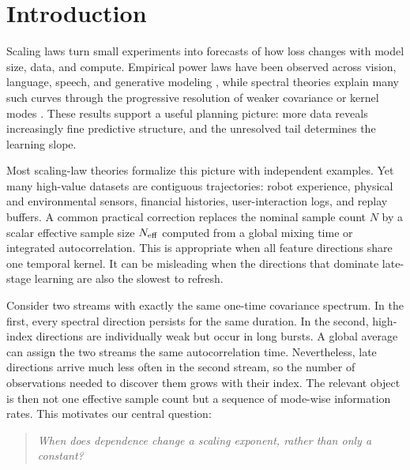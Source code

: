 \section{Introduction}

Scaling laws turn small experiments into forecasts of how loss changes with
model size, data, and compute.  Empirical power laws have been observed across
vision, language, speech, and generative modeling
\cite{hestness2017deep,rosenfeld2020constructive,kaplan2020scaling,hoffmann2022training},
while spectral theories explain many such curves through the progressive
resolution of weaker covariance or kernel modes
\cite{sollich1998learning,bordelon2020spectrum,canatar2021spectral,bahri2024explaining,lin2024scaling}.
These results support a useful planning picture: more data reveals increasingly
fine predictive structure, and the unresolved tail determines the learning
slope.

Most scaling-law theories formalize this picture with independent examples.
Yet many high-value datasets are contiguous trajectories: robot experience,
physical and environmental sensors, financial histories, user-interaction
logs, and replay buffers.  A common practical correction replaces the nominal
sample count $N$ by a scalar effective sample size $N_{\rm eff}$ computed from
a global mixing time or integrated autocorrelation.  This is appropriate when
all feature directions share one temporal kernel.  It can be misleading when
the directions that dominate late-stage learning are also the slowest to
refresh.

Consider two streams with exactly the same one-time covariance spectrum.  In
the first, every spectral direction persists for the same duration.  In the
second, high-index directions are individually weak but occur in long bursts.
A global average can assign the two streams the same autocorrelation time.
Nevertheless, late directions arrive much less often in the second stream, so
the number of observations needed to discover them grows with their index.
The relevant object is then not one effective sample count but a sequence of
mode-wise information rates.  This motivates our central question:
\begin{quote}
\emph{When does dependence change a scaling exponent, rather than only a
constant?}
\end{quote}

